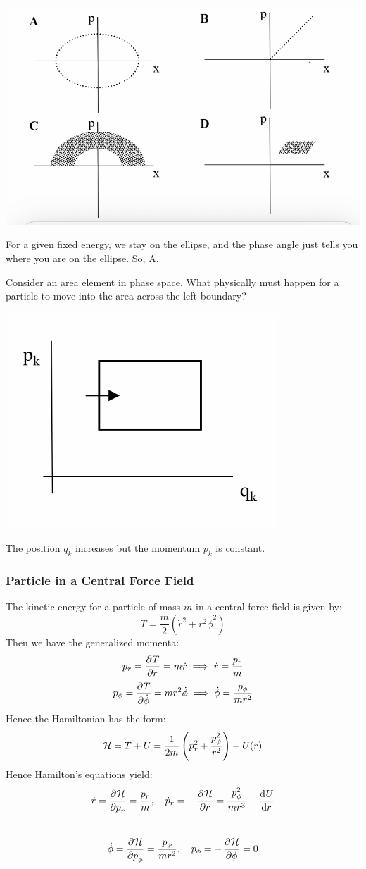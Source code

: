 \begin{center}
    \includegraphics[scale=0.7]{Lecture-23/l23-img3.png}
\end{center}
\begin{s}
For a given fixed energy, we stay on the ellipse, and the phase angle just tells you where you are on the ellipse. So, A.
\end{s}
Consider an area element in phase space. What physically must happen for a particle to move into the area across the left boundary?
\begin{center}
    \includegraphics[scale=1]{Lecture-23/l23-img4.png}
\end{center}
\begin{s}
The position $q_k$ increases but the momentum $p_k$ is constant.
\end{s}

\subsubsection{Particle in a Central Force Field}
The kinetic energy for a particle of mass $m$ in a central force field is given by:
\[T = \frac{m}{2}\left(\dot{r}^2 + r^2\dot{\phi}^2\right)\]
Then we have the generalized momenta:
\[p_r = \dpd{T}{\dot{r}} = m\dot{r} \implies \dot{r} = \frac{p_r}{m}\]
\[p_\phi = \dpd{T}{\dot{\phi}} = mr^2\dot{\phi} \implies \dot{\phi} = \frac{p_\phi}{mr^2}\]
Hence the Hamiltonian has the form:
\[\mathcal{H} = T + U = \frac{1}{2m}\left(p_r^2 + \frac{p_\phi^2}{r^2}\right) + U(r)\]
Hence Hamilton's equations yield:
\[\dot{r} = \dpd{\HH}{p_r} = \frac{p_r}{m}, \quad \dot{p}_r = -\dpd{\HH}{r} = \frac{p_\phi^2}{mr^3} - \dod{U}{r}\]\
\[\dot{\phi} = \dpd{\HH}{p_\phi} = \frac{p_\phi}{mr^2}, \quad p_\phi = -\dpd{\HH}{\phi} = 0\]
